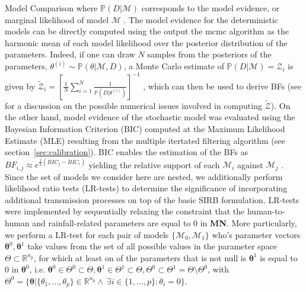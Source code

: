 \begin{minipage}{\textwidth}
\begin{mybox}{Model Comparison}
 where $\mathbb{P}(D|\mathcal{M})$ corresponds to the model evidence, or marginal likelihood of model $\mathcal{M}$ \parencite{Aitkin:PosteriorBayesFactors:1991}. The model evidence for the deterministic models can be directly computed using the output the mcmc algorithm as the harmonic mean of each model likelihood over the posterior distribution of the parameters. Indeed, if one can draw $N$ samples from the posteriors of the parameters, $\theta^{(i)} \sim \mathbb{P}(\theta|\mathcal{M}, D)$, a Monte Carlo estimate of $\mathbb{P}(D|\mathcal{M}) = \mathcal{Z}_i$ is given by $\tilde{\mathcal{Z}}_i = {\left[ \frac{1}{N} \sum_{i=1}^N \frac{1}{\mathbb{P}(D|\theta^{(i)})} \right]^{-1}}$ \parencite{Weinberg:ComputingBayesFactor:2012}, which can then be used to derive BFs (see \parencite{Raftery:EstimatingIntegratedLikelihood:2007} for a discussion on the possible numerical issues involved in computing $\tilde{\mathcal{Z}}$). On the other hand, model evidence of the stochastic model was evaluated using the Bayesian Information Criterion (BIC) computed at the Maximum Likelihood Estimate (MLE) resulting from the multiple itertated filtering algorithm (see section~\ref{sec:calibration}). BIC enables the estimation of the BFs as $BF_{i,j} \approx e^{\frac{1}{2}(BIC_j - BIC_i)}$ yielding the relative support of each $\mathcal{M}_i$ against $\mathcal{M}_j$ \parencite{Schwarz:EstimatingDimensionModel:1978a,Burnham:MultimodelInferenceUnderstanding:2004}. Since the set of models we consider here are nested, we additionally perform likelihood ratio tests (LR-tests) to determine the significance of incorporating additional transmission processes on top of the basic SIRB formulation. LR-tests were implemented by sequentially\footnotemark{} relaxing the constraint that the human-to-human and rainfall-related parameters are equal to 0 in \textbf{MN}. More particularly, we perform a LR-test for each pair of models $\{\mathcal{M}_0, \mathcal{M}_1\}$ who's parameter vectors $\boldsymbol{\theta}^0,\boldsymbol{\theta}^1$ take values from the set of all possible values in the parameter space $\Theta \subset \mathbb{R}^{n_p}$, for which at least on of the parameters that is not null is $\boldsymbol{\theta}^1$ is equal to 0 in $\boldsymbol{\theta}^0$, i.e.  $\boldsymbol{\theta}^0 \in \Theta^0 \subset \Theta, \boldsymbol{\theta}^1 \in \Theta^1 \subset \Theta, \Theta^0 \subset \Theta^1 = \Theta \setminus \Theta^0$, with $\Theta^0 = \{ \boldsymbol{\theta} | \{\theta_1, \dots, \theta_p  \} \in \mathbb{R}^{n_p} \wedge \ \exists i \in \{1,\dots, p\} : \theta_i = 0 \} $.

\end{mybox}
\end{minipage}
